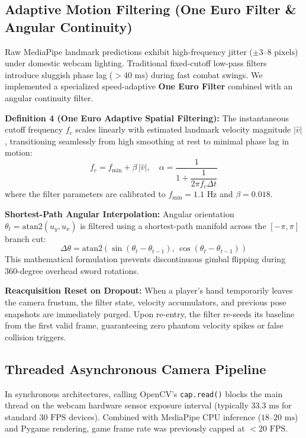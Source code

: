 \documentclass[11pt,a4paper]{article}
\begin{document}
\subsection{Adaptive Motion Filtering (One Euro Filter \& Angular Continuity)}
Raw MediaPipe landmark predictions exhibit high-frequency jitter ($\pm 3\text{--}8\text{ pixels}$) under domestic webcam lighting. Traditional fixed-cutoff low-pass filters introduce sluggish phase lag ($> 40\text{ ms}$) during fast combat swings. We implemented a specialized speed-adaptive \textbf{One Euro Filter} combined with an angular continuity filter.

\begin{FormulaCard}
\textbf{\color{NavyPrimary}Definition 4 (One Euro Adaptive Spatial Filtering):} The instantaneous cutoff frequency $f_c$ scales linearly with estimated landmark velocity magnitude $|\widehat{v}|$, transitioning seamlessly from high smoothing at rest to minimal phase lag in motion:
{\large
\begin{equation}
f_c = f_{\min} + \beta \, |\widehat{v}|, \quad \alpha = \frac{1}{1 + \dfrac{1}{2\pi f_c \Delta t}}
\label{eq:one_euro}
\end{equation}
}
\vspace{-0.5em}
where the filter parameters are calibrated to $f_{\min} = 1.1\text{ Hz}$ and $\beta = 0.018$.
\end{FormulaCard}

\textbf{Shortest-Path Angular Interpolation:}
Angular orientation $\theta_t = \mathrm{atan2}(u_y, u_x)$ is filtered using a shortest-path manifold across the $[-\pi, \pi]$ branch cut:
\begin{equation}
\Delta \theta = \mathrm{atan2}\left(\sin(\theta_t - \theta_{t-1}), \, \cos(\theta_t - \theta_{t-1})\right)
\label{eq:angular_wrap}
\end{equation}
This mathematical formulation prevents discontinuous gimbal flipping during 360-degree overhead sword rotations.

\textbf{Reacquisition Reset on Dropout:}
When a player's hand temporarily leaves the camera frustum, the filter state, velocity accumulators, and previous pose snapshots are immediately purged. Upon re-entry, the filter re-seeds its baseline from the first valid frame, guaranteeing zero phantom velocity spikes or false collision triggers.

\subsection{Threaded Asynchronous Camera Pipeline}
In synchronous architectures, calling OpenCV's \texttt{cap.read()} blocks the main thread on the webcam hardware sensor exposure interval (typically $33.3\text{ ms}$ for standard $30\text{ FPS}$ devices). Combined with MediaPipe CPU inference ($18\text{--}20\text{ ms}$) and Pygame rendering, game frame rate was previously capped at $< 20\text{ FPS}$.
\end{document}
